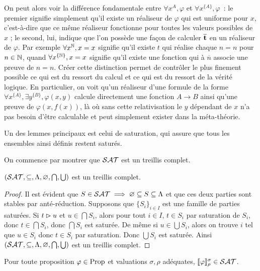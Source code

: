 \documentclass{article}
\begin{document}
On peut alors voir la différence fondamentale entre $\forall x^A, \varphi$ et $\forall x^{\{A\}}, \varphi$~: le premier signifie simplement qu'il existe un réaliseur de $\varphi$ qui est uniforme pour $x$, c'est-à-dire que ce même réaliseur fonctionne pour toutes les valeurs possibles de $x$ ; le second, lui, indique que l'on possède une façon de calculer $\overline {\mathbf{t}}$ en un réaliseur de $\varphi$. Par exemple $\forall x^{\mathbb{N}}, x = x$ signifie qu'il existe $t$ qui réalise chaque $n = n$ pour $n\in \mathbb{N}$, quand $\forall x^{\{\mathbb{N}\}}, x = x$ signifie qu'il existe une fonction qui à $\overline n$ associe une preuve de $n = n$. Créer cette distinction permet de contrôler le plus finement possible ce qui est du ressort du calcul et ce qui est du ressort de la vérité logique. En particulier, on voit qu'un réaliseur d'une formule de la forme $\forall x^{\{A\}}, \exists y^{\{B\}}, \varphi(x,y)$ calcule directement une fonction $A \to B$ ainsi qu'une preuve de $\varphi(x,f(x))$, là où sans cette relativisation le $y$ dépendant de $x$ n'a pas besoin d'être calculable et peut simplement exister dans la méta-théorie.

Un des lemmes principaux est celui de saturation, qui assure que tous les ensembles ainsi définis restent saturés.

On commence par montrer que $\mathcal {SAT}$ est un treillis complet.

\begin{lem}
  $(\mathcal {SAT},\subseteq,\Lambda,\varnothing,\bigcap,\bigcup)$ est un treillis complet.
\end{lem}

\begin{proof}
  Il est évident que $S\in \mathcal {SAT} \implies \varnothing\subseteq S \subseteq \Lambda$ et que ces deux parties sont stables par anté-réduction. Supposons que $\{S_i\}_{i\in I}$ est une famille de parties saturées. Si $t\rhd u$ et $u \in \bigcap S_i$, alors pour tout $i \in I$, $t \in S_i$ par saturation de $S_i$, donc $t\in \bigcap S_i$, donc $\bigcap S_i$ est saturée. De même si $u \in \bigcup S_i$, alors on trouve $i$ tel que $u \in S_i$ donc $t\in S_i$ par saturation. Donc $\bigcup S_i$ est saturée. Ainsi $(\mathcal {SAT},\subseteq,\Lambda,\varnothing, \bigcap,\bigcup)$ est un treillis complet.
\end{proof}

\begin{lem}[Saturation]
  Pour toute proposition $\varphi \in \mathrm{Prop}$ et valuations $\sigma,\rho$ adéquates, $\llbracket \varphi \rrbracket_\rho^\sigma\in\mathcal {SAT}$.
\end{lem}
\end{document}

